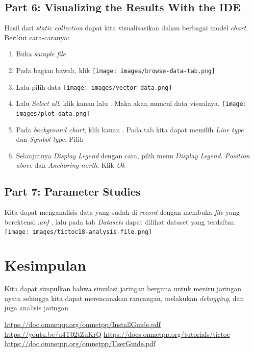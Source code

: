 \documentclass[conference]{IEEEtran}
\begin{document}
\subsection{Part 6: Visualizing the Results With the IDE}
Hasil dari \textit{static collection} dapat kita visualisasikan dalam berbagai model \textit{chart}. Berikut cara-caranya:
\begin{enumerate}
	\item Buka \textit{sample file} 
	\item Pada bagian bawah, klik 
	      \texttt{[image: images/browse-data-tab.png]}
	      \newpage
	\item Lalu pilih  data
	      \texttt{[image: images/vector-data.png]}
	\item Lalu \textit{Select all}, klik kanan lalu . Maka akan muncul data visualnya.
	      \texttt{[image: images/plot-data.png]}

	\item Pada \textit{background chart}, klik kanan . Pada tab  kita dapat memilih \textit{Line type} dan \textit{Symbol type}. Pilih 
	\item Selanjutnya \textit{Display Legend} dengan cara, pilih menu  \textit{Display Legend}. \textit{Position above} dan \textit{Anchoring north}. Klik \textit{Ok}
\end{enumerate}

\subsection{Part 7: Parameter Studies}
Kita dapat menganalisis data yang sudah di \textit{record} dengan membuka \textit{file} yang berektensi \textit{.anf} , lalu pada tab \textit{Datasets} dapat dilihat dataset yang terdaftar.
\texttt{[image: images/tictoc18-analysis-file.png]}

\section{Kesimpulan}
Kita dapat simpulkan bahwa simulasi jaringan berguna untuk meniru jaringan nyata sehingga kita dapat merencanakan rancangan, melakukan \textit{debugging}, dan juga analisis jaringan.


\begin{thebibliography}{1}
	\url{https://doc.omnetpp.org/omnetpp/InstallGuide.pdf}
	\url{https://youtu.be/u4T02tZuKrQ}
	\url{https://docs.omnetpp.org/tutorials/tictoc}
	\url{https://doc.omnetpp.org/omnetpp/UserGuide.pdf}
\end{thebibliography}
\end{document}
